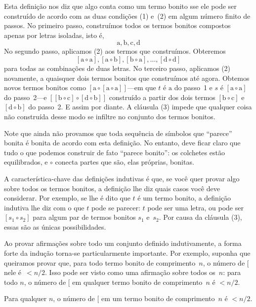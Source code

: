 \documentclass[../../../include/open-logic-section]{subfiles}
\begin{document}
Esta definição nos diz que algo conta como um termo bonito sse ele
pode ser construído de acordo com as duas condições (1) e~(2) em algum
número finito de passos. No primeiro passo, construímos todos os termos bonitos
compostos apenas por letras isoladas, isto é,
\[
\mathrm{a}, \mathrm{b}, \mathrm{c}, \mathrm{d}
\]
No segundo passo, aplicamos (2) aos termos que construímos. Obteremos
\[
[\mathrm{a} \circ \mathrm{a}], [\mathrm{a} \circ \mathrm{b}],
[\mathrm{b} \circ \mathrm{a}], \dots, [\mathrm{d} \circ \mathrm{d}]
\]
para todas as combinações de duas letras. No terceiro passo, aplicamos (2)
novamente, a quaisquer dois termos bonitos que construímos até agora. Obtemos novos
termos bonitos como $[\mathrm{a} \circ [\mathrm{a} \circ
    \mathrm{a}]]$---em que $t$ é $\mathrm{a}$ do passo~1 e $s$ é
$[\mathrm{a} \circ \mathrm{a}]$ do passo~2---e $[[\mathrm{b} \circ
    \mathrm{c}] \circ [\mathrm{d} \circ \mathrm{b}]]$ construído a partir
dos dois termos $[\mathrm{b} \circ \mathrm{c}]$ e $[\mathrm{d}
  \circ \mathrm{b}]$ do passo~2. E assim por diante.  A cláusula (3) impede
que qualquer coisa não construída desse modo se infiltre no conjunto dos termos
bonitos.

Note que ainda não provamos que toda sequência de símbolos que
``parece'' bonita é bonita de acordo com esta definição. No entanto,
deve ficar claro que tudo o que podemos construir de fato ``parece
bonito'': os colchetes estão equilibrados, e $\circ$ conecta partes que são,
elas próprias, bonitas.

A característica-chave das definições indutivas é que, se você quer provar
algo sobre todos os termos bonitos, a definição lhe diz quais casos
você deve considerar.  Por exemplo, se lhe é dito que $t$ é um termo
bonito, a definição indutiva lhe diz com o que $t$ pode se parecer: $t$
pode ser uma letra, ou pode ser $[s_1 \circ s_2]$ para algum par de
termos bonitos $s_1$ e~$s_2$. Por causa da cláusula (3), essas são as únicas
possibilidades.

Ao provar afirmações sobre todo um conjunto definido indutivamente, a
forma forte da indução torna-se particularmente importante. Por exemplo,
suponha que queiramos provar que, para todo termo bonito de comprimento~$n$, o
número de $[$ nele é~$< n/2$.  Isso pode ser visto como uma afirmação sobre
todos os~$n$: para todo $n$, o número de $[$ em qualquer termo bonito de
comprimento~$n$ é $< n/2$.

\begin{prop}
  Para qualquer $n$, o número de $[$ em um termo bonito de comprimento~$n$ é
  $< n/2$.
\end{prop}
\end{document}
